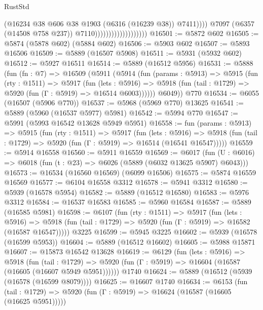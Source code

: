 \begin{lexlean}{RustStd}
\begin{coremodule}
                                                (@16234
                                                  @38
                                                  @606
                                                  @38
                                                  @1903
                                                  (@6316 (@16239 @38))
                                                  @7411))))
                                          @7097
                                          (@6357 (@14508 @758 @237))
                                          @7110)))))))))))))))))))
@16501 := @5872 @602
@16505 := @5874 (@5878 @602) (@5884 @602)
@16506 := @5903 @602
@16507 := @5893 @16506
@16509 := @5889 (@16507 @5908)
@16511 := @5931 (@5932 @602)
@16512 := @5927 @16511
@16514 := @5889 (@16512 @5956)
@16531 := @5888
    (fun (fn : @7) =>
    @16509
      (@5911
        (@5914
          (fun (params : @5913) =>
          @5915
            (fun (rty : @1511) =>
            @5917
              (fun (lets : @5916) =>
              @5918 (fun (tail : @1729) => @5920 (fun (Γ : @5919) => @16514 @6003))))))
        @6049))
    @770
@16534 := @6055 (@16507 (@5906 @770))
@16537 := @5968 (@5969 @770) @13625
@16541 := @5889 (@5960 (@16537 @5977) @5981)
@16542 := @5994 @770
@16547 := @5991 (@5993 @16542 @13628 @5949 @5951)
@16558 := fun (params : @5913) =>
  @5915
    (fun (rty : @1511) =>
    @5917
      (fun (lets : @5916) =>
      @5918 (fun (tail : @1729) => @5920 (fun (Γ : @5919) => @16514 (@16541 @16547)))))
@16559 := @5914 @16558
@16560 := @5911 @16559
@16569 := @6017
    (fun (U : @6016) => @6018 (fun (t : @23) => @6026 (@5889 (@6032 @13625 @5907) @6043)))
@16573 := @16534 (@16560 @16569) (@6099 @16506)
@16575 := @5874 @16559 @16569
@16577 := @6104 @16558 @3312
@16578 := @5941 @3312
@16580 := @5939 (@16578 @5954)
@16582 := @5889 (@16512 @16580)
@16583 := @5976 @3312
@16584 := @16537 @16583
@16585 := @5960 @16584
@16587 := @5889 (@16585 @5981)
@16598 := @6107
    (fun (rty : @1511) =>
    @5917
      (fun (lets : @5916) =>
      @5918 (fun (tail : @1729) => @5920 (fun (Γ : @5919) => @16582 (@16587 @16547)))))
    @3225
@16599 := @5945 @3225
@16602 := @5939 (@16578 (@16599 @5953))
@16604 := @5889 (@16512 @16602)
@16605 := @5988 @15871
@16607 := @15873 @16542 @13628
@16619 := @6129
    (fun (lets : @5916) =>
    @5918
      (fun (tail : @1729) =>
      @5920 (fun (Γ : @5919) => @16604 (@16587 (@16605 (@16607 @5949 @5951))))))
    @1740
@16624 := @5889 (@16512 (@5939 (@16578 (@16599 @8079))))
@16625 := @16607 @1740
@16634 := @6153
    (fun (tail : @1729) => @5920 (fun (Γ : @5919) => @16624 (@16587 (@16605 (@16625 @5951)))))

\end{coremodule}
\end{lexlean}
